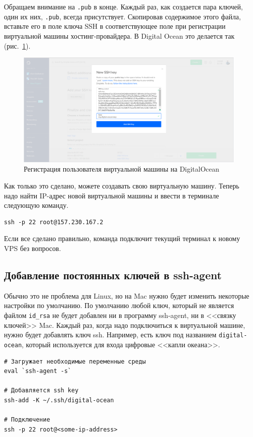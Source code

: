 \documentclass[a4paper,12pt,final,openany]{extbook}
\begin{document}
Обращаем внимание на \texttt{.pub} в конце. Каждый раз, как создается
пара ключей, один их них, \texttt{.pub}, всегда присутствует. Скопировав
содержимое этого файла, вставьте его в поле ключа SSH в соответствующее
поле при регистрации виртуальной машины хостинг-провайдера. В Digital
Ocean это делается так (рис.~\ref{fig:userreg}).

\begin{figure}[tbh]
  \centering
  \includegraphics[width=0.9\linewidth]{blog/2019/bash-essentials/digital-ocean-key.png}

  \caption{Регистрация пользователя виртуальной машины на DigitalOcean}
  \label{fig:userreg}
\end{figure}
Как только это сделано, можете создавать свою виртуальную машину. Теперь
надо найти IP-адрес новой виртуальной машины и ввести в терминале
следующую команду.
\begin{verbatim}
ssh -p 22 root@157.230.167.2
\end{verbatim}
Если все сделано правильно, команда подключит текущий терминал к новому VPS без вопросов.

\hypertarget{Permanently-Add-Keys-to-ssh-agent}{%
\subsection{\texorpdfstring{\protect\hyperlink{Permanently-Add-Keys-to-ssh-agent}{}Добавление
постоянных ключей в
ssh-agent}{Добавление постоянных ключей в ssh-agent}}\label{Permanently-Add-Keys-to-ssh-agent}}

Обычно это не проблема для Linux, но на Mac нужно будет изменить
некоторые настройки по умолчанию. По умолчанию любой ключ, который не
является файлом \texttt{id\_rsa} не будет добавлен ни в программу
ssh-agent, ни в <<связку ключей>> Mac. Каждый раз, когда надо подключиться
к виртуальной машине, нужно будет добавлять ключ ssh. Например, есть
ключ под названием \texttt{digital-ocean}, который используется для
входа цифровые <<капли океана>>.
\begin{verbatim}
# Загружает необходимые переменные среды
eval `ssh-agent -s`

# Добавляется ssh key
ssh-add -K ~/.ssh/digital-ocean

# Подключение
ssh -p 22 root@<some-ip-address>
\end{verbatim}
\end{document}
